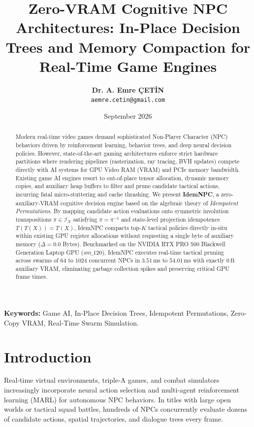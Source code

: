 \documentclass[journal,10pt,twocolumn]{article}
\title{\textbf{Zero-VRAM Cognitive NPC Architectures: In-Place Decision Trees and Memory Compaction for Real-Time Game Engines}}
\author{
    \textbf{Dr. A. Emre \c{C}ET\.{I}N}\\
    \texttt{aemre.cetin@gmail.com}
}
\date{September 2026}
\begin{document}
\maketitle

\begin{abstract}
Modern real-time video games demand sophisticated Non-Player Character (NPC) behaviors driven by reinforcement learning, behavior trees, and deep neural decision policies. However, state-of-the-art gaming architectures enforce strict hardware partitions where rendering pipelines (rasterization, ray tracing, BVH updates) compete directly with AI systems for GPU Video RAM (VRAM) and PCIe memory bandwidth. Existing game AI engines resort to out-of-place tensor allocation, dynamic memory copies, and auxiliary heap buffers to filter and prune candidate tactical actions, incurring fatal micro-stuttering and cache thrashing. We present \textbf{IdemNPC}, a zero-auxiliary-VRAM cognitive decision engine based on the algebraic theory of \textit{Idempotent Permutations}. By mapping candidate action evaluations onto symmetric involution transpositions $\pi \in \mathcal{I}_N$ satisfying $\pi = \pi^{-1}$ and state-level projection idempotence $T(T(X)) = T(X)$, IdemNPC compacts top-$K$ tactical policies directly in-situ within existing GPU register allocations without requesting a single byte of auxiliary memory ($\Delta = 0.0$ Bytes). Benchmarked on the NVIDIA RTX PRO 500 Blackwell Generation Laptop GPU ($sm\_120$), IdemNPC executes real-time tactical pruning across swarms of 64 to 1024 concurrent NPCs in $3.51\,\text{ms}$ to $54.01\,\text{ms}$ with exactly $0\,\text{B}$ auxiliary VRAM, eliminating garbage collection spikes and preserving critical GPU frame times.
\end{abstract}

\noindent\textbf{Keywords:} Game AI, In-Place Decision Trees, Idempotent Permutations, Zero-Copy VRAM, Real-Time Swarm Simulation.

\section{Introduction}
Real-time virtual environments, triple-A games, and combat simulators increasingly incorporate neural action selection and multi-agent reinforcement learning (MARL) for autonomous NPC behaviors. In titles with large open worlds or tactical squad battles, hundreds of NPCs concurrently evaluate dozens of candidate actions, spatial trajectories, and dialogue trees every frame.
\end{document}
